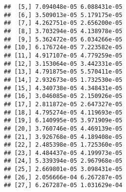 \documentclass[
]{article}
\begin{document}
\begin{verbatim}
##  [5,] 7.094048e-05 6.088431e-05
##  [6,] 3.509013e-05 5.179175e-05
##  [7,] 4.262751e-05 2.656200e-05
##  [8,] 3.703294e-05 4.138978e-05
##  [9,] 5.362472e-05 6.034266e-05
## [10,] 6.176724e-05 7.223582e-05
## [11,] 4.917107e-05 4.779259e-05
## [12,] 3.153064e-05 3.442331e-05
## [13,] 4.791875e-05 5.570411e-05
## [14,] 2.932673e-05 1.732530e-05
## [15,] 4.340738e-05 4.348431e-05
## [16,] 3.046085e-05 2.150926e-05
## [17,] 2.811872e-05 2.647327e-05
## [18,] 4.795274e-05 4.119693e-05
## [19,] 6.140995e-05 3.971909e-05
## [20,] 3.760746e-05 4.469139e-05
## [21,] 3.926768e-05 4.189408e-05
## [22,] 2.485398e-05 1.725360e-05
## [23,] 4.484437e-05 4.199973e-05
## [24,] 5.339394e-05 2.967968e-05
## [25,] 2.669801e-05 3.098431e-05
## [26,] 2.056666e-04 6.267287e-05
## [27,] 6.267287e-05 1.031629e-04
\end{verbatim}
\end{document}
